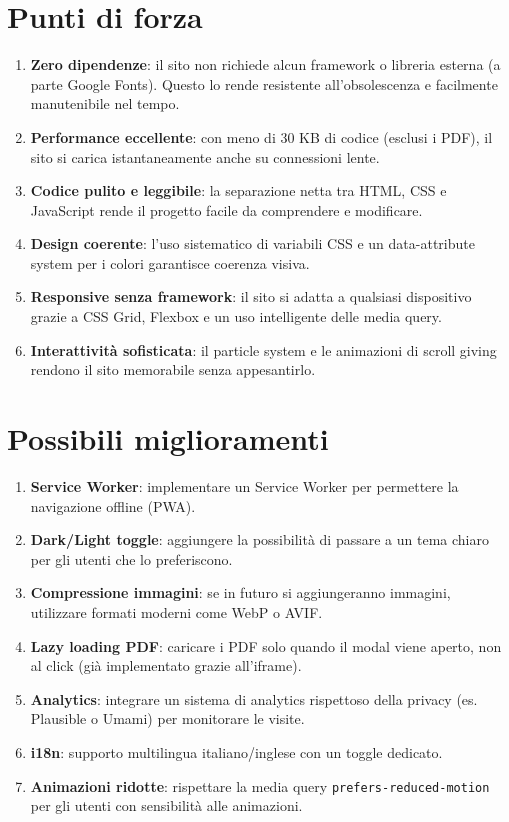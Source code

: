 \documentclass[a4paper,12pt]{report}
\begin{document}
\section{Punti di forza}

\begin{enumerate}[leftmargin=2cm]
    \item \textbf{Zero dipendenze}: il sito non richiede alcun framework o libreria esterna (a parte Google Fonts). Questo lo rende resistente all'obsolescenza e facilmente manutenibile nel tempo.
    \item \textbf{Performance eccellente}: con meno di 30 KB di codice (esclusi i PDF), il sito si carica istantaneamente anche su connessioni lente.
    \item \textbf{Codice pulito e leggibile}: la separazione netta tra HTML, CSS e JavaScript rende il progetto facile da comprendere e modificare.
    \item \textbf{Design coerente}: l'uso sistematico di variabili CSS e un data-attribute system per i colori garantisce coerenza visiva.
    \item \textbf{Responsive senza framework}: il sito si adatta a qualsiasi dispositivo grazie a CSS Grid, Flexbox e un uso intelligente delle media query.
    \item \textbf{Interattivit\`a sofisticata}: il particle system e le animazioni di scroll giving rendono il sito memorabile senza appesantirlo.
\end{enumerate}

\section{Possibili miglioramenti}

\begin{enumerate}[leftmargin=2cm]
    \item \textbf{Service Worker}: implementare un Service Worker per permettere la navigazione offline (PWA).
    \item \textbf{Dark/Light toggle}: aggiungere la possibilit\`a di passare a un tema chiaro per gli utenti che lo preferiscono.
    \item \textbf{Compressione immagini}: se in futuro si aggiungeranno immagini, utilizzare formati moderni come WebP o AVIF.
    \item \textbf{Lazy loading PDF}: caricare i PDF solo quando il modal viene aperto, non al click (gi\`a implementato grazie all'iframe).
    \item \textbf{Analytics}: integrare un sistema di analytics rispettoso della privacy (es. Plausible o Umami) per monitorare le visite.
    \item \textbf{i18n}: supporto multilingua italiano/inglese con un toggle dedicato.
    \item \textbf{Animazioni ridotte}: rispettare la media query \texttt{prefers-reduced-motion} per gli utenti con sensibilit\`a alle animazioni.
\end{enumerate}
\end{document}
